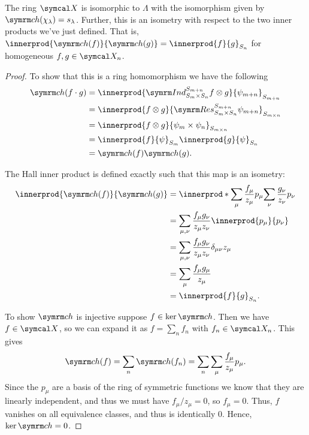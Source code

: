 \begin{thm}{}{}
    The ring \(\classFunctions\) is isomorphic to \(\Lambda\) with the isomorphism given by \(\ch(\chi_\lambda) = s_\lambda\).
    Further, this is an isometry with respect to the two inner products we've just defined.
    That is, \(\innerprod{\ch(f)}{\ch(g)} = \innerprod{f}{g}_{S_n}\) for homogeneous \(f, g \in \classFunctions_n\).
    \begin{proof}
        To show that this is a ring homomorphism we have the following
        \begin{align}
            \ch(f \cdot g) &= \innerprod{\Ind^{S_{m+n}}_{S_m \times S_n} f \otimes g}{\psi_{m+n}}_{S_{m+n}}\\
            &= \innerprod{f \otimes g}{\Res^{S_{m+n}}_{S_m \times S_n} \psi_{m+n}}_{S_{m\times n}}\\
            &= \innerprod{f \otimes g}{\psi_m \times \psi_{n}}_{S_{m\times n}}\\
            &= \innerprod{f}{\psi}_{S_m} \innerprod{g}{\psi}_{S_n}\\
            &= \ch(f) \ch(g).
        \end{align}
        
        The Hall inner product is defined exactly such that this map is an isometry:
        \begin{align}
            \innerprod{\ch(f)}{\ch(g)} &= \innerprod*{\sum_\mu \frac{f_\mu}{z_\mu} p_\mu}{\sum_\nu \frac{g_\nu}{z_\nu} p_\nu}\\
            &= \sum_{\mu,\nu} \frac{f_\mu g_\nu}{z_\mu z_\nu} \innerprod{p_\mu}{p_\nu}\\
            &= \sum_{\mu,\nu} \frac{f_\mu g_\nu}{z_\mu z_\nu} \delta_{\mu\nu}z_\mu\\
            &= \sum_\mu \frac{f_\mu g_\mu}{z_\mu}\\
            &= \innerprod{f}{g}_{S_n}.
        \end{align}
        
        To show \(\ch\) is injective suppose \(f \in \ker \ch\).
        Then we have \(f \in \classFunctions\), so we can expand it as \(f = \sum_n f_n\) with \(f_n \in \classFunctions_n\).
        This gives
        \begin{equation}
            \ch(f) = \sum_n \ch(f_n) = \sum_n \sum_\mu \frac{f_\mu}{z_\mu} p_\mu.
        \end{equation}
        Since the \(p_\mu\) are a basis of the ring of symmetric functions we know that they are linearly independent, and thus we must have \(f_\mu/z_\mu = 0\), so \(f_\mu = 0\).
        Thus, \(f\) vanishes on all equivalence classes, and thus is identically \(0\).
        Hence, \(\ker \ch = 0\).
        

\end{proof}
\end{thm}

